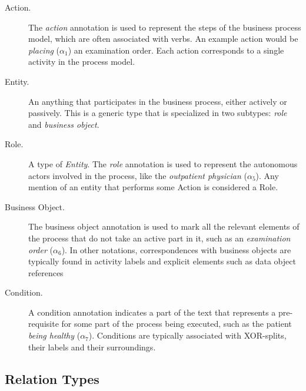 \begin{description}
\item[Action.]{The \emph{action} annotation is used to represent the steps of the
    business process model, which are often associated with verbs. An example action
    would be \emph{placing} ($\alpha_1$) an examination order. Each action
    corresponds to a single activity in the process model.}
\item[Entity.]{An anything that participates in the business process, either
    actively or passively. This is a generic type that is specialized in two
    subtypes: \emph{role} and \emph{business object}.}
\item[Role.]{A type of \emph{Entity}. The \emph{role} annotation is used to
    represent the autonomous actors involved in the process, like the
    \emph{outpatient physician} ($\alpha_5$). Any mention of an entity that
    performs some Action is considered a Role.}
\item[Business Object.]{The business object annotation is used to mark all the 
    relevant elements of the process that do not take an active part in it, such as 
    an \emph{examination order} ($\alpha_6$).
    In other notations, correspondences with business objects are typically
    found in activity labels and explicit elements such as data object references}
\item[Condition.]{A condition annotation indicates a part of the text that
    represents a pre-requisite for some part of the process being executed, such 
    as the patient \emph{being healthy} ($\alpha_7$). Conditions are typically 
    associated with XOR-splits, their labels and their surroundings.}
\end{description}

%

\subsection{Relation Types}
\label{sec:atd_relations}


